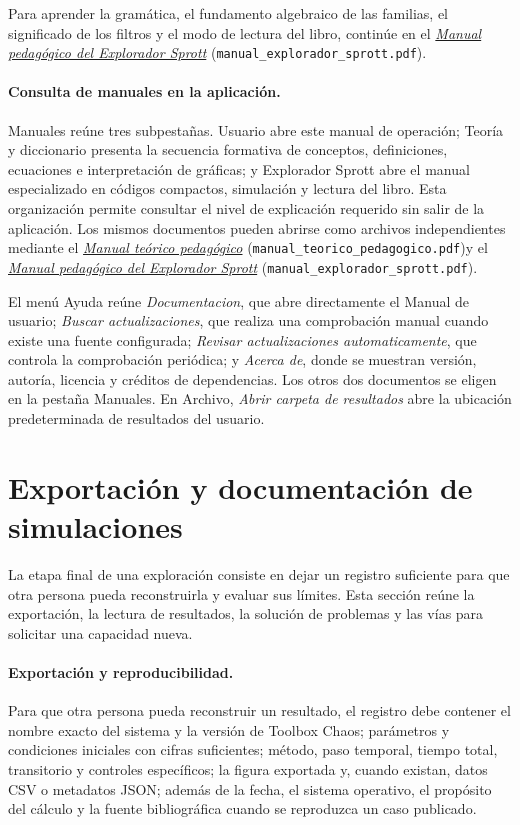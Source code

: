 \documentclass[11pt]{article}
\newcommand{\boton}[1]{\textsf{\itshape #1}}
\newcommand{\campo}[1]{\textsf{#1}}
\newcommand{\manualteorico}{\href{run:manual_teorico_pedagogico.pdf}{\emph{Manual teórico pedagógico}} (\nolinkurl{manual_teorico_pedagogico.pdf})}
\newcommand{\manualsprott}{\href{run:manual_explorador_sprott.pdf}{\emph{Manual pedagógico del Explorador Sprott}} (\nolinkurl{manual_explorador_sprott.pdf})}
\begin{document}
Para aprender la gramática, el fundamento algebraico de las familias, el significado de los filtros y el modo de lectura del libro, continúe en el \manualsprott.

\paragraph{Consulta de manuales en la aplicación.}

\campo{Manuales} reúne tres subpestañas. \campo{Usuario} abre este manual de operación; \campo{Teoría y diccionario} presenta la secuencia formativa de conceptos, definiciones, ecuaciones e interpretación de gráficas; y \campo{Explorador Sprott} abre el manual especializado en códigos compactos, simulación y lectura del libro. Esta organización permite consultar el nivel de explicación requerido sin salir de la aplicación. Los mismos documentos pueden abrirse como archivos independientes mediante el \manualteorico y el \manualsprott.

El menú \campo{Ayuda} reúne \boton{Documentacion}, que abre directamente el Manual de usuario; \boton{Buscar actualizaciones}, que realiza una comprobación manual cuando existe una fuente configurada; \boton{Revisar actualizaciones automaticamente}, que controla la comprobación periódica; y \boton{Acerca de}, donde se muestran versión, autoría, licencia y créditos de dependencias. Los otros dos documentos se eligen en la pestaña \campo{Manuales}. En \campo{Archivo}, \boton{Abrir carpeta de resultados} abre la ubicación predeterminada de resultados del usuario.



\section{Exportación y documentación de simulaciones}

La etapa final de una exploración consiste en dejar un registro suficiente para que otra persona pueda reconstruirla y evaluar sus límites. Esta sección reúne la exportación, la lectura de resultados, la solución de problemas y las vías para solicitar una capacidad nueva.

\paragraph{Exportación y reproducibilidad.}

Para que otra persona pueda reconstruir un resultado, el registro debe contener el nombre exacto del sistema y la versión de Toolbox Chaos; parámetros y condiciones iniciales con cifras suficientes; método, paso temporal, tiempo total, transitorio y controles específicos; la figura exportada y, cuando existan, datos CSV o metadatos JSON; además de la fecha, el sistema operativo, el propósito del cálculo y la fuente bibliográfica cuando se reproduzca un caso publicado.
\end{document}
